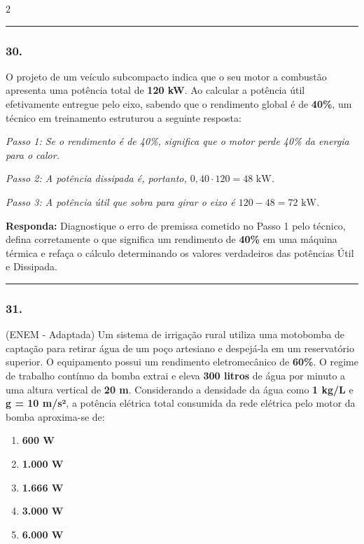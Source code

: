 \documentclass[twoside, 10pt, a4paper]{article}
\newlength{\espacoPreQuestao}\setlength{\espacoPreQuestao}{0.1cm}
\newlength{\espacoQuestao}\setlength{\espacoQuestao}{0.2cm}
\newlength{\espacoAlt}\setlength{\espacoAlt}{0.2cm}
\begin{document}
\begin{multicols*}{2}
\noindent\textcolor{CorLinha}{\rule{\linewidth}{0.5pt}} 
\par\vspace{\espacoPreQuestao}
\subsubsection*{30.} O projeto de um veículo subcompacto indica que o seu motor a combustão apresenta uma potência total de \textbf{120 kW}. Ao calcular a potência útil efetivamente entregue pelo eixo, sabendo que o rendimento global é de \textbf{40\%}, um técnico em treinamento estruturou a seguinte resposta:

\textit{Passo 1: Se o rendimento é de 40\%, significa que o motor perde 40\% da energia para o calor.}

\textit{Passo 2: A potência dissipada é, portanto, $ 0,40 \cdot 120 = 48 \text{ kW} $.}

\textit{Passo 3: A potência útil que sobra para girar o eixo é $ 120 - 48 = 72 \text{ kW} $.}
\begin{boxresponda}
\textbf{Responda:} Diagnostique o erro de premissa cometido no Passo 1 pelo técnico, defina corretamente o que significa um rendimento de \textbf{40\%} em uma máquina térmica e refaça o cálculo determinando os valores verdadeiros das potências Útil e Dissipada.
\end{boxresponda}
\par\vspace{\espacoQuestao}

\noindent\textcolor{CorLinha}{\rule{\linewidth}{0.5pt}} 
\par\vspace{\espacoPreQuestao}
\subsubsection*{31.} (ENEM - Adaptada) Um sistema de irrigação rural utiliza uma motobomba de captação para retirar água de um poço artesiano e despejá-la em um reservatório superior. O equipamento possui um rendimento eletromecânico de \textbf{60\%}. O regime de trabalho contínuo da bomba extrai e eleva \textbf{300 litros} de água por minuto a uma altura vertical de \textbf{20 m}. Considerando a densidade da água como \textbf{1 kg/L} e \textbf{g = 10 m/s²}, a potência elétrica total consumida da rede elétrica pelo motor da bomba aproxima-se de:
\begin{enumerate}[label=\alph*), itemsep=\espacoAlt]
    \item \textbf{600 W}
    \item \textbf{1.000 W}
    \item \textbf{1.666 W}
    \item \textbf{3.000 W}
    \item \textbf{6.000 W}
\end{enumerate}
\par\vspace{\espacoQuestao}


\end{multicols*}
\end{document}
